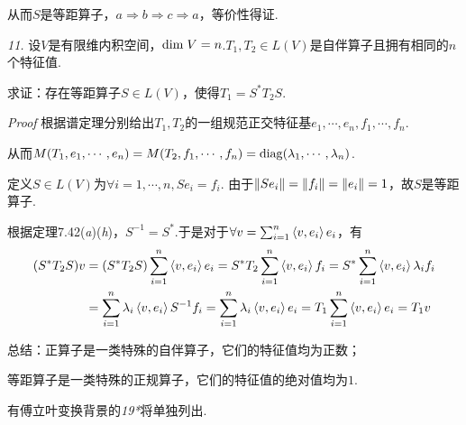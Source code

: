 从而\(S\)是等距算子，\(a \Rightarrow b \Rightarrow c \Rightarrow a\)，等价性得证.

\hspace*{\fill}

\textit{11.}
设\(V\)是有限维内积空间，\(\mathrm{dim \;} V=n\).\(T_1,T_2 \in L(V)\)是自伴算子且拥有相同的\(n\)个特征值.

求证：存在等距算子\(S \in L(V)\)，使得\(T_1=S^*T_2S\).

\textit{Proof}
根据谱定理分别给出\(T_1,T_2\)的一组规范正交特征基\(e_1,\cdots,e_n,f_1,\cdots,f_n\).

从而\(M(T_1,e_1,\cdots,e_n)=M(T_2,f_1,\cdots,f_n)=\mathrm{diag}(\lambda_1,\cdots,\lambda_n)\).

定义\(S \in L(V)\)为\(\forall i=1,\cdots,n,Se_i=f_i\).
由于\(\left\lVert Se_i \right\rVert=\left\lVert f_i \right\rVert=\left\lVert e_i \right\rVert=1\)，故\(S\)是等距算子.

根据定理7.42(\textit{a})(\textit{h})，\(S^{-1}=S^*\).于是对于\(\forall v=\sum_{i=1}^n \left\langle v,e_i \right\rangle e_i\)，有
    \begin{align*}
        (S^*T_2S)v&=(S^*T_2S)\sum_{i=1}^n \left\langle v,e_i \right\rangle e_i=S^*T_2\sum_{i=1}^n \left\langle v,e_i \right\rangle f_i
        =S^*\sum_{i=1}^n \left\langle v,e_i \right\rangle\lambda_if_i \\
        &=\sum_{i=1}^n \lambda_i\left\langle v,e_i \right\rangle S^{-1}f_i
        =\sum_{i=1}^n \lambda_i\left\langle v,e_i \right\rangle e_i=T_1\sum_{i=1}^n \left\langle v,e_i \right\rangle e_i=T_1v
    \end{align*}

\hspace*{\fill}

总结：正算子是一类特殊的自伴算子，它们的特征值均为正数；

等距算子是一类特殊的正规算子，它们的特征值的绝对值均为\(1\).

\hspace*{\fill}

有傅立叶变换背景的\textit{19*}将单独列出.


